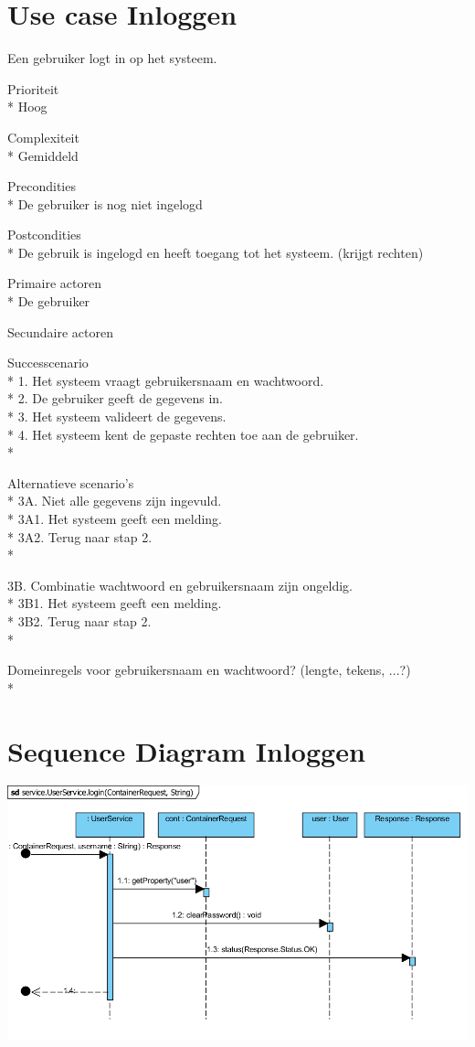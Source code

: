 \documentclass[pdftex,a4paper,12pt,twoside]{report}
\begin{document}
\section{Use case Inloggen}
Een gebruiker logt in op het systeem.

Prioriteit\\*
Hoog

Complexiteit\\*
Gemiddeld

Precondities \\*
De gebruiker is nog niet ingelogd

Postcondities \\*
De gebruik is ingelogd en heeft toegang tot het systeem. (krijgt rechten)

Primaire actoren\\*
De gebruiker

Secundaire actoren 

Successcenario\\*
1.	Het systeem vraagt gebruikersnaam en wachtwoord.\\*
2.	De gebruiker geeft de gegevens in.\\*
3.	Het systeem valideert de gegevens.\\*
4.	Het systeem kent de gepaste rechten toe aan de gebruiker.\\*

Alternatieve scenario’s\\*
3A. Niet alle gegevens zijn ingevuld.\\*
3A1. Het systeem geeft een melding.\\*
3A2. Terug naar stap 2.\\*

3B. Combinatie wachtwoord en gebruikersnaam zijn ongeldig.\\*
3B1. Het systeem geeft een melding.\\*
3B2. Terug naar stap 2.\\*

Domeinregels voor gebruikersnaam en wachtwoord? (lengte, tekens, ...?)\\*
\section{Sequence Diagram Inloggen}
\includegraphics[width=\textwidth]{images/inloggenuser.png}
\end{document}
